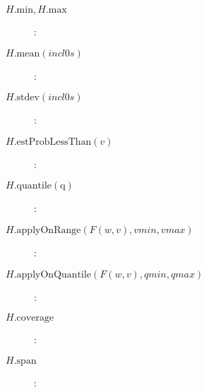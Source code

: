 \begin{description}

\item[$H.\mathrm{min}, H.\mathrm{max}$]: \\

\item[$H.\mathrm{mean}(\mathit{incl0s})$]: \\

\item[$H.\mathrm{stdev}(\mathit{incl0s})$]: \\

\item[$H.\mathrm{estProbLessThan}(v)$]: \\

\item[$H.\mathrm{quantile(q)}$]: \\

\item[$H.\mathrm{applyOnRange}(F(w,v),\mathit{vmin},\mathit{vmax})$]: \\

\item[$H.\mathrm{applyOnQuantile}(F(w,v),\mathit{qmin},\mathit{qmax})$]: \\

\item[$H.\mathrm{coverage}$]: \\

\item[$H.\mathrm{span}$]: \\

\end{description}


